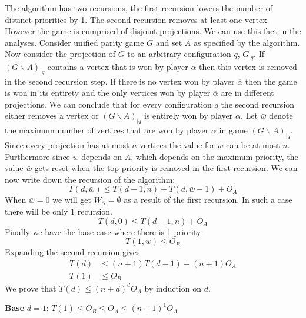 The algorithm has two recursions, the first recursion lowers the number of distinct priorities by 1. The second recursion removes at least one vertex. However the game is comprised of disjoint projections. We can use this fact in the analyses. Consider unified parity game $G$ and set $A$ as specified by the algorithm. Now consider the projection of $G$ to an arbitrary configuration $q$, $G_{|q}$. If $(G\backslash A)_{|q}$ contains a vertex that is won by player $\overline{\alpha}$ then this vertex is removed in the second recursion step. If there is no vertex won by player $\overline{\alpha}$ then the game is won in its entirety and the only vertices won by player $\overline{\alpha}$ are in different projections. We can conclude that for every configuration $q$ the second recursion either removes a vertex or $(G\backslash A)_{|q}$ is entirely won by player $\alpha$. Let $\bar{w}$ denote the maximum number of vertices that are won by player $\overline{\alpha}$ in game $(G\backslash A)_{|q}$. Since every projection has at most $n$ vertices the value for $\bar{w}$ can be at most $n$. Furthermore since $\bar{w}$ depends on $A$, which depends on the maximum priority, the value $\bar{w}$ gets reset when the top priority is removed in the first recursion. We can now write down the recursion of the algorithm:
\[ T(d,\bar{w}) \leq T(d-1,n) + T(d, \bar{w} - 1) + O_A \]
When $\bar{w} = 0$ we will get $W_{\overline{\alpha}} = \emptyset$ as a result of the first recursion. In such a case there will be only 1 recursion.
\[ T(d,0) \leq T(d-1,n) + O_A \]
Finally we have the base case where there is 1 priority:
\[ T(1, \bar{w}) \leq O_B \]
Expanding the second recursion gives
\begin{align*}
T(d) &\leq (n+1)T(d-1) + (n+1)O_A\\
T(1) &\leq O_B
\end{align*}
We prove that $T(d) \leq (n+d)^dO_A$ by induction on $d$.

\textbf{Base} $d=1$: $T(1) \leq O_B \leq O_A \leq (n+1)^1O_A$

